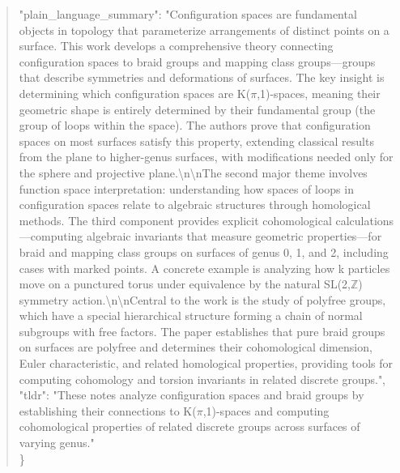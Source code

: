 \documentclass[11pt]{article}
\begin{document}
\begin{quote}
  "plain\_language\_summary": "Configuration spaces are fundamental objects in topology that parameterize arrangements of distinct points on a surface. This work develops a comprehensive theory connecting configuration spaces to braid groups and mapping class groups---groups that describe symmetries and deformations of surfaces. The key insight is determining which configuration spaces are K(\ensuremath{\pi},1)-spaces, meaning their geometric shape is entirely determined by their fundamental group (the group of loops within the space). The authors prove that configuration spaces on most surfaces satisfy this property, extending classical results from the plane to higher-genus surfaces, with modifications needed only for the sphere and projective plane.\textbackslash{}n\textbackslash{}nThe second major theme involves function space interpretation: understanding how spaces of loops in configuration spaces relate to algebraic structures through homological methods. The third component provides explicit cohomological calculations---computing algebraic invariants that measure geometric properties---for braid and mapping class groups on surfaces of genus 0, 1, and 2, including cases with marked points. A concrete example is analyzing how k particles move on a punctured torus under equivalence by the natural SL(2,\ensuremath{\mathbb{Z}}) symmetry action.\textbackslash{}n\textbackslash{}nCentral to the work is the study of polyfree groups, which have a special hierarchical structure forming a chain of normal subgroups with free factors. The paper establishes that pure braid groups on surfaces are polyfree and determines their cohomological dimension, Euler characteristic, and related homological properties, providing tools for computing cohomology and torsion invariants in related discrete groups.",\\
  "tldr": "These notes analyze configuration spaces and braid groups by establishing their connections to K(\ensuremath{\pi},1)-spaces and computing cohomological properties of related discrete groups across surfaces of varying genus."\\
\}\\
\end{quote}
\end{document}
